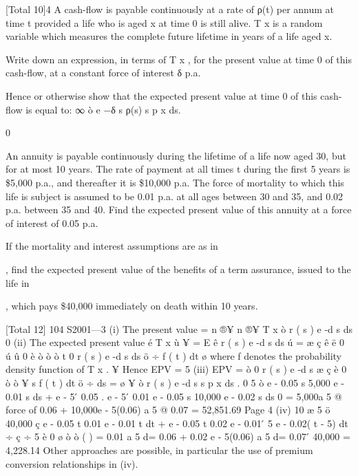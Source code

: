 \documentclass[a4paper,1pt]{article}
\begin{document}
[Total 10]4
A cash-flow is payable continuously at a rate of ρ(t) per annum at time t provided
a life who is aged x at time 0 is still alive. T x is a random variable which
measures the complete future lifetime in years of a life aged x.
\item  Write down an expression, in terms of T x , for the present value at time 0
of this cash-flow, at a constant force of interest δ p.a.
\item  Hence or otherwise show that the expected present value at time 0 of this
cash-flow is equal to:
∞
ò e
−δ s
ρ(s) s p x ds.

0
\item 
An annuity is payable continuously during the lifetime of a life now
aged 30, but for at most 10 years. The rate of payment at all times t
during the first 5 years is \$5,000 p.a., and thereafter it is \$10,000 p.a.
The force of mortality to which this life is subject is assumed to be
0.01 p.a. at all ages between 30 and 35, and 0.02 p.a. between 35 and 40.
Find the expected present value of this annuity at a force of interest of
0.05 p.a.

\item 
If the mortality and interest assumptions are as in \item , find the expected
present value of the benefits of a term assurance, issued to the life in \item ,
which pays \$40,000 immediately on death within 10 years.

[Total 12]
104 S2001—3
(i) The present value =
n ®¥
n ®¥
T x
ò r ( s ) e
-d s
ds
0
(ii)
The expected present value
é T x
ù ¥
= E ê r ( s ) e -d s ds ú = æ ç
ê ë 0
ú û 0 è
ò
ò ò
t
0
r ( s ) e -d s ds ö ÷ f ( t ) dt
ø
where f denotes the probability density function of T x .
¥
Hence EPV =
5
(iii)
EPV =
ò
0
r ( s ) e -d s æ ç
è
0
ò
ò
¥
s
f ( t ) dt ö ÷ ds =
ø
¥
ò r ( s ) e
-d s
s
p x ds .
0
5
ò
e - 0.05 s 5,000 e - 0.01 s ds + e - 5  ́ 0.05 . e - 5  ́ 0.01 e - 0.05 s 10,000 e - 0.02 s ds
0
= 5,000a 5 @ force of 0.06 + 10,000e - 5(0.06) a 5 @ 0.07 = 52,851.69
Page 4 %
(iv)
10
æ 5
ö
40,000 ç e - 0.05 t 0.01 e - 0.01 t dt + e - 0.05 t 0.02 e - 0.01  ́ 5 e - 0.02( t - 5) dt ÷
ç
÷
5
è 0
ø
ò
ò
(
)
= 0.01 a 5 d= 0.06 + 0.02 e - 5(0.06) a 5 d= 0.07  ́ 40,000
= 4,228.14
Other approaches are possible, in particular the use of premium conversion
relationships in (iv).
\end{document}

